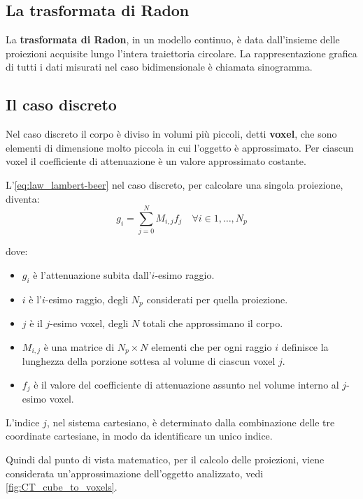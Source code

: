\documentclass[12pt,a4paper]{report}
\begin{document}
\subsection{La trasformata di Radon}

La \textbf{trasformata di Radon}, in un modello continuo, è data dall'insieme delle proiezioni acquisite lungo l'intera
traiettoria circolare.
La rappresentazione grafica di tutti i dati misurati nel caso bidimensionale è chiamata sinogramma.

\subsection{Il caso discreto}

Nel caso discreto il corpo è diviso in volumi più piccoli, detti \textbf{voxel}, che sono elementi di dimensione molto piccola in
cui l'oggetto è approssimato.
Per ciascun voxel il coefficiente di attenuazione è un valore approssimato costante.

L'\autoref{eq:law_lambert-beer} nel caso discreto, per calcolare una singola proiezione, diventa:
\begin{equation} \label{eq:law_lambert-beer_discrete}
  g_i = \sum_{j=0}^N M_{i, j} f_j \quad \forall i \in 1, \dots, N_p
\end{equation}

dove:
\begin{itemize}
  \item \(g_i\) è l'attenuazione subita dall'\(i\)-esimo raggio.
  \item \(i\) è l'\(i\)-esimo raggio, degli \(N_p\) considerati per quella proiezione.
  \item \(j\) è il \(j\)-esimo voxel, degli \(N\) totali che approssimano il corpo.
  \item \(M_{i,j}\) è una matrice di \(N_p \times N\) elementi che per ogni raggio \(i\) definisce la lunghezza della porzione
        sottesa al volume di ciascun voxel \(j\).
  \item \(f_j\) è il valore del coefficiente di attenuazione assunto nel volume interno al \(j\)-esimo voxel.
\end{itemize}

L'indice \(j\), nel sistema cartesiano, è determinato dalla combinazione delle tre coordinate cartesiane, in modo da identificare
un unico indice.

Quindi dal punto di vista matematico, per il calcolo delle proiezioni, viene considerata un'approssimazione dell'oggetto
analizzato, vedi \autoref{fig:CT_cube_to_voxels}.
\end{document}
